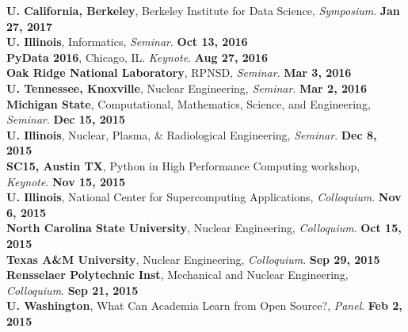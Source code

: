\documentclass[margin,line]{resume}
\begin{document}
\begin{resume}
      \textbf{U. California, Berkeley}, Berkeley Institute for Data Science, \emph{Symposium}.  \hfill\textbf{Jan 27, 2017}\\
      \textbf{U. Illinois}, Informatics, \emph{Seminar}.  \hfill\textbf{Oct 13, 2016}\\
      \textbf{PyData 2016}, Chicago, IL. \emph{Keynote}.  \hfill\textbf{Aug 27, 2016}\\
      \textbf{Oak Ridge National Laboratory}, RPNSD, \emph{Seminar}.  \hfill\textbf{Mar 3, 2016}\\
      \textbf{U. Tennessee, Knoxville}, Nuclear Engineering, \emph{Seminar}.  \hfill\textbf{Mar 2, 2016}\\
      \textbf{Michigan State}, Computational, Mathematics, Science, and Engineering, \emph{Seminar}.  \hfill\textbf{Dec 15, 2015}\\
      \textbf{U. Illinois}, Nuclear, Plasma, \& Radiological Engineering, \emph{Seminar}.          \hfill\textbf{Dec 8, 2015}\\
      \textbf{SC15, Austin TX}, Python in High Performance Computing workshop, \emph{Keynote}.     \hfill\textbf{Nov 15, 2015}\\
      \textbf{U. Illinois}, National Center for Supercomputing Applications, \emph{Colloquium}.    \hfill\textbf{Nov 6, 2015}\\
      \textbf{North Carolina State University}, Nuclear Engineering, \emph{Colloquium}.            \hfill\textbf{Oct 15, 2015}\\
      \textbf{Texas A\&M University}, Nuclear Engineering, \emph{Colloquium}.                      \hfill\textbf{ Sep 29, 2015}\\
      \textbf{Rensselaer Polytechnic Inst}, Mechanical and Nuclear Engineering, \emph{Colloquium}. \hfill\textbf{Sep 21, 2015}\\
      \textbf{U. Washington}, What Can Academia Learn from Open Source?, \emph{Panel}.   \hfill\textbf{Feb 2, 2015}

\end{resume}
\end{document}
